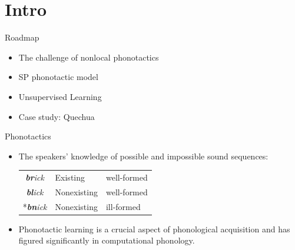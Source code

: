 \begin{frame}
\titlepage
\end{frame}


\section{Intro}

\begin{frame}{Roadmap}
    \begin{itemize}
        \item The challenge of nonlocal phonotactics
        \item SP phonotactic model
        \item Unsupervised Learning
        \item Case study: Quechua
    \end{itemize}
\end{frame}


\begin{frame}{Phonotactics}
\begin{itemize}
\item The speakers' knowledge of possible and impossible sound sequences:\\
\begin{center}
\begin{tabular}{cll}
\textit{\textbf{br}ick}& Existing  & well-formed\\
\textit{\textbf{bl}ick}&Nonexisting  &  well-formed\\
*\textit{\textbf{bn}ick}&Nonexisting  & ill-formed
\end{tabular}
\end{center}
\hfill \small \citep{chomsky1965some,hayes2008maximum}

\item Phonotactic learning is a crucial aspect of phonological acquisition and has figured significantly in computational phonology.
\hfill \small \citep{}
\end{itemize}

\end{frame}

